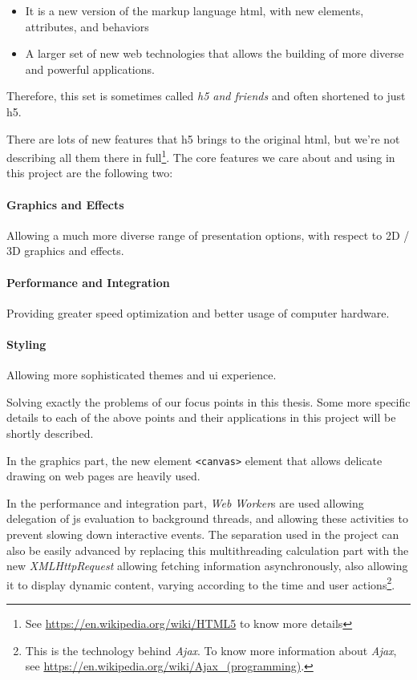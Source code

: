 \begin{itemize}
    \item It is a new version of the markup language \gls{html}, with new elements, attributes, and behaviors
    \item A larger set of new web technologies that allows the building of more diverse and powerful applications.
\end{itemize}

Therefore, this set is sometimes called \emph{\gls{h5} and friends} and often shortened to just \gls{h5}.

There are lots of new features that \gls{h5} brings to the original \gls{html}, but we're not describing all them there in full\footnote{ See \url{https://en.wikipedia.org/wiki/HTML5} to know more details}. The core features we care about and using in this project are the following two:

\paragraph{Graphics and Effects} Allowing a much more diverse range of presentation options, with respect to 2D / 3D graphics and effects.
\paragraph{Performance and Integration} Providing greater speed optimization and better usage of computer hardware.
\paragraph{Styling} Allowing more sophisticated themes and \gls{ui} experience.

Solving exactly the problems of our focus points in this thesis. Some more specific details to each of the above points and their applications in this project will be shortly described.

In the graphics part, the new element \texttt{<canvas>} element that allows delicate drawing on web pages are heavily used. 

In the performance and integration part, \emph{Web Worker}s are used allowing delegation of \gls{js} evaluation to background threads, and allowing these activities to prevent slowing down interactive events. The separation used in the project can also be easily advanced by replacing this multithreading calculation part with the new \emph{XMLHttpRequest} allowing fetching information asynchronously, also allowing it to display dynamic content, varying according to the time and user actions\footnote{ This is the technology behind \emph{Ajax}. To know more information about \emph{Ajax}, see \url{https://en.wikipedia.org/wiki/Ajax_(programming)}.}. 

